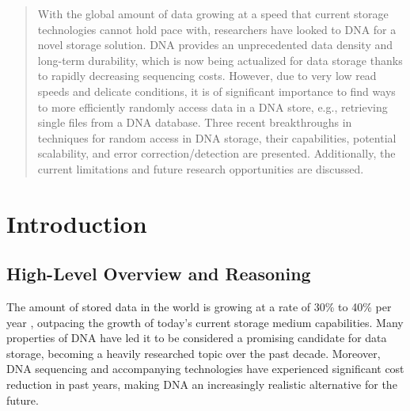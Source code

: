 \documentclass[a4paper,conference]{IEEEtran}
\begin{document}
\begin{abstract}
With the global amount of data growing at a speed that current storage technologies cannot hold pace with, researchers have looked to DNA for a novel storage solution. DNA provides an unprecedented data density and long-term durability, which is now being actualized for data storage thanks to rapidly decreasing sequencing costs. However, due to very low read speeds and delicate conditions, it is of significant importance to find ways to more efficiently randomly access data in a DNA store, e.g., retrieving single files from a DNA database. Three recent breakthroughs in techniques for random access in DNA storage, their capabilities, potential scalability, and error correction/detection are presented. Additionally, the current limitations and future research opportunities are discussed.
\end{abstract}





%
\IEEEpeerreviewmaketitle


\section{Introduction}

\subsection{High-Level Overview and Reasoning}

The amount of stored data in the world is growing at a rate of 30\% to 40\% per year \cite{globaldatagrowth}, outpacing the growth of today's current storage medium capabilities. Many properties of DNA have led it to be considered a promising candidate for data storage, becoming a heavily researched topic over the past decade.  Moreover, DNA sequencing and accompanying technologies have experienced significant cost reduction \cite{dnabasedarchival} in past years, making DNA an increasingly realistic alternative for the future. 
\end{document}
